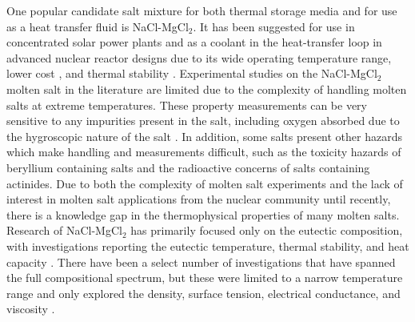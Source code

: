\documentclass[review]{elsarticle}
\begin{document}
One popular candidate salt mixture for both thermal storage media and for use as a heat transfer fluid is NaCl-MgCl$_{2}$. It has been suggested for use in concentrated solar power plants and as a coolant in the heat-transfer loop in advanced nuclear reactor designs due to its wide operating temperature range, lower cost \cite{williams2008evaluation}, and thermal stability \cite{XU2020568,williams2006assessment}. Experimental studies on the NaCl-MgCl$_2$ molten salt in the literature are limited due to the complexity of handling molten salts at extreme temperatures. These property measurements can be very sensitive to any impurities present in the salt, including oxygen absorbed due to the hygroscopic nature of the salt \cite{bell2019corrosion}. In addition, some salts present other hazards which make handling and measurements difficult, such as the toxicity hazards of beryllium containing salts and the radioactive concerns of salts containing actinides. Due to both the complexity of molten salt experiments and the lack of interest in molten salt applications from the nuclear community until recently, there is a knowledge gap in the thermophysical properties of many molten salts. Research of NaCl-MgCl$_{2}$ has primarily focused only on the eutectic composition, with investigations reporting the eutectic temperature, thermal stability, and heat capacity \cite{MOHAN2018156}. There have been a select number of investigations that have spanned the full compositional spectrum, but these were limited to a narrow temperature range and only explored the density, surface tension, electrical conductance, and viscosity \cite{Janz1988}.
\end{document}
